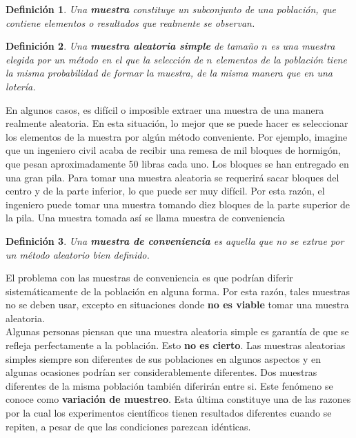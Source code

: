 \documentclass[10pt,a4paper]{book}
\newtheorem{defi}{\textbf{Definición}}
\begin{document}
\begin{defi}
	Una \textbf{muestra} constituye un subconjunto de una población, que contiene elementos o resultados que realmente se observan.
\end{defi}

\begin{defi}
	Una \textbf{muestra aleatoria simple} de tamaño $ n $ es una muestra elegida por un método en el que la selección de $ n $ elementos de la población tiene la misma probabilidad de formar la muestra, de la misma manera que en una lotería.
\end{defi}

En algunos casos, es difícil o imposible extraer una muestra de una manera realmente aleatoria. En esta situación, lo mejor que se puede hacer es seleccionar los elementos de la muestra por algún método conveniente. Por ejemplo, imagine que un ingeniero civil acaba de recibir una remesa de mil bloques de hormigón, que pesan aproximadamente 50 libras cada uno. Los bloques se han entregado en una gran pila. Para tomar una muestra aleatoria se requerirá sacar bloques del centro y de la parte inferior, lo que puede ser muy difícil. Por esta razón, el ingeniero puede tomar una muestra tomando diez bloques de la parte superior de la pila. Una muestra tomada así se llama muestra de conveniencia

\begin{defi}
	Una \textbf{muestra de conveniencia} es aquella que no se extrae por un método aleatorio bien definido.
\end{defi}

El problema con las muestras de conveniencia es que podrían diferir sistemáticamente de la población en alguna forma. Por esta razón, tales muestras no se deben usar, excepto en situaciones donde \textbf{no es viable} tomar una muestra aleatoria.\\

Algunas personas piensan que una muestra aleatoria simple es garantía de que se refleja perfectamente a la población. Esto \textbf{no es cierto}. Las muestras aleatorias simples siempre son diferentes de sus poblaciones en algunos aspectos y en algunas ocasiones podrían ser considerablemente diferentes. Dos muestras diferentes de la misma población también diferirán entre si. Este fenómeno se conoce como \textbf{variación de muestreo}. Esta última constituye una de las razones por la cual los experimentos científicos tienen resultados diferentes cuando se repiten, a pesar de que las condiciones parezcan idénticas.
\end{document}

